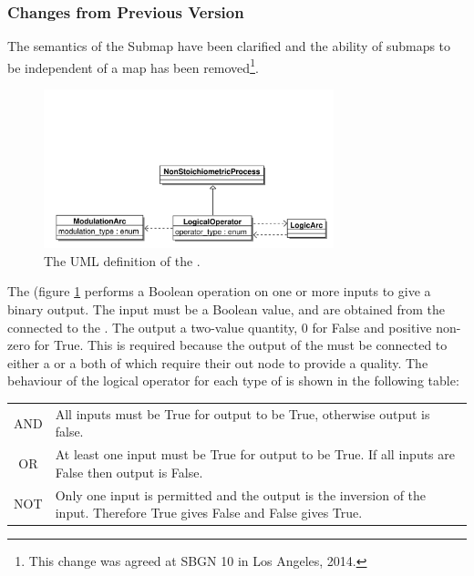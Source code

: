 \subsubsection{Changes from Previous Version}

The semantics of the Submap have been clarified and the ability of
submaps to be independent of a map has been removed\footnote{This
  change was agreed at SBGN 10 in Los Angeles, 2014.}.

\label{sec:techref:logic}
\label{defn:LogicalOperator}

\begin{figure}[htb]
  \centering
  \includegraphics[width = 0.75\textwidth]{images/logicaloperatoruml}
  \caption{The UML definition of the .}
  \label{fig:techref:logicaloperatoruml}
\end{figure}

 The  (figure \ref{fig:techref:logicaloperatoruml} performs a Boolean operation on one or
more inputs to give a binary output. The input must be a Boolean
value, and are obtained from the  connected to the
. The output a two-value quantity,  0 for False and positive
non-zero for True. This is required because the output of the
 must be connected to either a
 or a  both of which
require their out node to provide a quality. The behaviour of the
logical operator for each type of  is shown in
the following table:

\begin{tabular}[t]{c p{12cm}}
\toprule
AND & All inputs must be True for output to be True, otherwise output
is false.\\
OR & At least one input must be True for output to be True. If all
inputs are False then output is False.\\
NOT & Only one input is permitted and the output is the inversion of
the input. Therefore True gives False and False gives True.\\
\bottomrule
\end{tabular}

